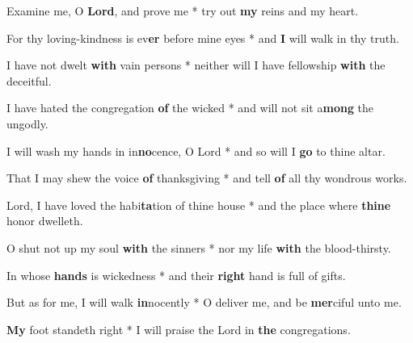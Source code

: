 \begin{multicols}{2}
	Examine me, O \textbf{Lord}, and prove me * try out \textbf{my} reins and my heart.
	
	For thy loving-kindness is ev\textbf{er} before mine eyes * and \textbf{I} will walk in thy truth.
	
	I have not dwelt \textbf{with} vain persons * neither will I have fellowship \textbf{with} the deceitful.
	
	I have hated the congregation \textbf{of} the wicked * and will not sit a\textbf{mong} the ungodly.
	
	I will wash my hands in in\textbf{no}cence, O Lord * and so will I \textbf{go} to thine altar.
	
	That I may shew the voice \textbf{of} thanksgiving * and tell \textbf{of} all thy wondrous works.
	
	Lord, I have loved the habi\textbf{ta}tion of thine house * and the place where \textbf{thine} honor dwelleth.
	
	O shut not up my soul \textbf{with} the sinners * nor my life \textbf{with} the blood-thirsty.
	
	In whose \textbf{hands} is wickedness * and their \textbf{right} hand is full of gifts.
	
	But as for me, I will walk \textbf{in}nocently * O deliver me, and be \textbf{mer}ciful unto me.
	
	\textbf{My} foot standeth right * I will praise the Lord in \textbf{the} congregations.
\end{multicols}